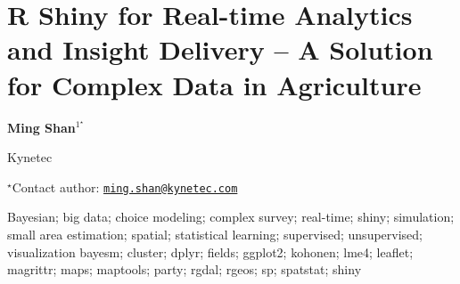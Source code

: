 \documentclass[\main/boa.tex]{subfiles}
\begin{document}
\section{R Shiny for Real-time Analytics and Insight Delivery -- A Solution for
Complex Data in Agriculture}

\begin{center}
  {\bf {} Ming Shan$^{1^\star}$}
\end{center}

\vskip 0.3cm

\begin{affiliations}
\begin{enumerate}
\begin{minipage}{0.915\textwidth}
\centering
\item Kynetec \\[-2pt]
\end{minipage}
\end{enumerate}
$^\star$Contact author: \href{mailto:ming.shan@kynetec.com}{\nolinkurl{ming.shan@kynetec.com}}\\
\end{affiliations}

\vskip 0.5cm

\begin{minipage}{0.915\textwidth}
\keywords Bayesian; big data; choice modeling; complex survey; real-time; shiny;
simulation; small area estimation; spatial; statistical learning;
supervised; unsupervised; visualization
\packages {} bayesm;  cluster;  dplyr;  fields;  ggplot2;  kohonen;  lme4;  leaflet;  magrittr;  maps;  maptools;  party;  rgdal;  rgeos;  sp;  spatstat;  shiny
\end{minipage}

\vskip 0.8cm
\end{document}
